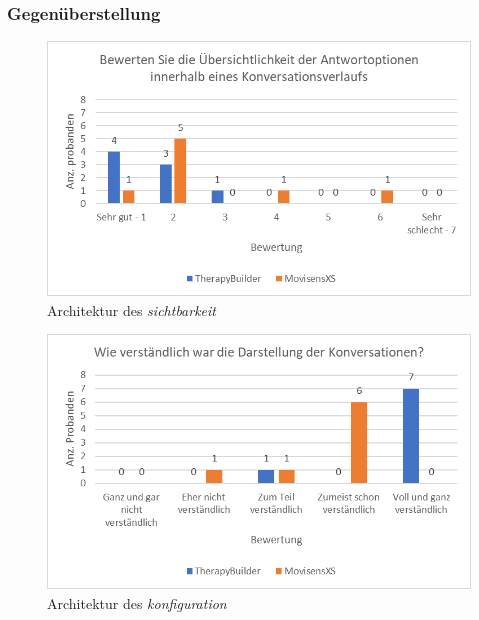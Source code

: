 \subsubsection{Gegenüberstellung}

\begin{figure}[h]
\centering
\includegraphics[width=1\textwidth]{pictures/diagramme/antwortoptkonv}
\caption{Architektur des \emph{sichtbarkeit}}
\label{antwortoptkonv}
\end{figure}

\begin{figure}[h]
\centering
\includegraphics[width=1\textwidth]{pictures/diagramme/konversationdarstellung}
\caption{Architektur des \emph{konfiguration}}
\label{konversationdarstellung}
\end{figure}

